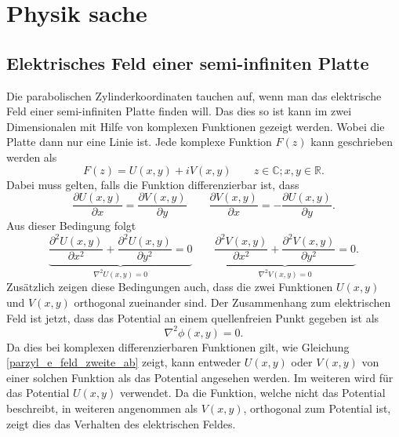 %
%
%
\section{Physik sache 
\label{parzyl:section:teil2}}


\subsection{Elektrisches Feld einer semi-infiniten Platte
\label{parzyl:subsection:bonorum}}
Die parabolischen Zylinderkoordinaten tauchen auf, wenn man das elektrische Feld einer semi-infiniten Platte finden will.
Das dies so ist kann im zwei Dimensionalen mit Hilfe von komplexen Funktionen gezeigt werden. Wobei die Platte dann nur eine Linie ist.
Jede komplexe Funktion $F(z)$ kann geschrieben werden als
\begin{equation}
	F(z) = U(x,y) + iV(x,y) \qquad z \in \mathbb{C}; x,y \in \mathbb{R}.
\end{equation}  
Dabei muss gelten, falls die Funktion differenzierbar ist, dass
\begin{equation}
	\frac{\partial U(x,y)}{\partial x} 
	=
	\frac{\partial V(x,y)}{\partial y} 
	\qquad
	\frac{\partial V(x,y)}{\partial x}
	=
	-\frac{\partial U(x,y)}{\partial y}.
\end{equation}
Aus dieser Bedingung folgt 
\begin{equation}
	\label{parzyl_e_feld_zweite_ab}
	\underbrace{
	\frac{\partial^2 U(x,y)}{\partial x^2}
	+ 
	\frac{\partial^2 U(x,y)}{\partial y^2}
	=
	0
	}_{\nabla^2U(x,y)=0}
	\qquad
	\underbrace{
	\frac{\partial^2 V(x,y)}{\partial x^2}
	+
	\frac{\partial^2 V(x,y)}{\partial y^2}
	=
	0
	}_{\nabla^2V(x,y) = 0}.
\end{equation}
Zusätzlich zeigen diese Bedingungen auch, dass die zwei Funktionen $U(x,y)$ und $V(x,y)$ orthogonal zueinander sind.
Der Zusammenhang zum elektrischen Feld ist jetzt, dass das Potential an einem quellenfreien Punkt gegeben ist als 
\begin{equation}
	\nabla^2\phi(x,y) = 0.
\end{equation}
Da dies bei komplexen differenzierbaren Funktionen gilt, wie Gleichung \ref{parzyl_e_feld_zweite_ab} zeigt, kann entweder $U(x,y)$ oder $V(x,y)$ von einer solchen Funktion als das Potential angesehen werden. Im weiteren wird für das Potential $U(x,y)$ verwendet.  
Da die Funktion, welche nicht das Potential beschreibt, in weiteren angenommen als $V(x,y)$, orthogonal zum Potential ist, zeigt dies das Verhalten des elektrischen Feldes.
